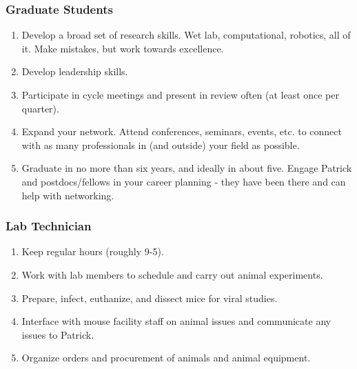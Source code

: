 \documentclass[10pt, a4paper, twocolumn]{article} %
\begin{document}
\subsubsection{Graduate Students}
\begin{enumerate}
\item Develop a broad set of research skills. Wet lab, computational, robotics, all of it. Make mistakes, but work towards excellence.
\item Develop leadership skills.
\item Participate in cycle meetings and present in review often (at least once per quarter).
\item Expand your network. Attend conferences, seminars, events, etc. to connect with as many professionals in (and outside) your field as possible.
\item Graduate in no more than six years, and ideally in about five. Engage Patrick and postdocs/fellows in your career planning - they have been there and can help with networking.
\end{enumerate}
\subsubsection{Lab Technician}
\begin{enumerate}
\item Keep regular hours (roughly 9-5).
\item Work with lab members to schedule and carry out animal experiments.
\item Prepare, infect, euthanize, and dissect mice for viral studies.
\item Interface with mouse facility staff on animal issues and communicate any issues to Patrick.
\item Organize orders and procurement of animals and animal equipment.
\end{enumerate}
\end{document}
